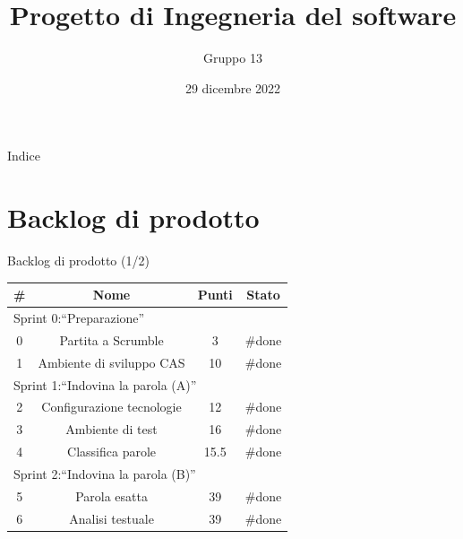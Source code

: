 \documentclass{beamer}
\title{Progetto di Ingegneria del software}
\author{Gruppo 13}
\institute{Universit\`a di Bologna}
\date{29 dicembre 2022}
\begin{document}
\begin{frame}
	\titlepage
\end{frame}

\begin{frame}{Indice}
	\tableofcontents
\end{frame}

\section{Backlog di prodotto}
\begin{frame}{Backlog di prodotto (1/2)}
	\begin{table}
		\begin{tabular}{|c|c|c|c|}
			\hline
			\textbf{\#} & \textbf{Nome}             & \textbf{Punti} & \textbf{Stato} \\
			\hline
			\multicolumn{4}{|l|}{Sprint 0:``Preparazione''}                           \\
			\hline
			0           & Partita a Scrumble        & 3              & \#done         \\
			\hline
			1           & Ambiente di sviluppo CAS  & 10             & \#done         \\
			\hline
			\multicolumn{4}{|l|}{Sprint 1:``Indovina la parola (A)''}                 \\
			\hline
			2           & Configurazione tecnologie & 12             & \#done         \\
			\hline
			3           & Ambiente di test          & 16             & \#done         \\
			\hline
			4           & Classifica parole         & 15.5           & \#done         \\
			\hline
			\multicolumn{4}{|l|}{Sprint 2:``Indovina la parola (B)''}                 \\
			\hline
			5           & Parola esatta             & 39             & \#done         \\
			\hline
			6           & Analisi testuale          & 39             & \#done         \\
			\hline
		\end{tabular}
	\end{table}
\end{frame}
\end{document}
